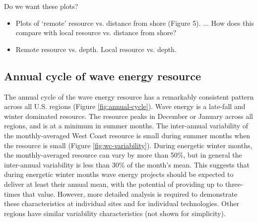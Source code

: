 
Do we want these plots?
\begin{itemize}
\item Plots of ‘remote’ resource vs. distance from shore (Figure 5). ... How does this compare with local resource vs. distance from shore?
\item Remote resource vs. depth. Local resource vs. depth.
\end{itemize}

\subsection{Annual cycle of wave energy resource}

The annual cycle of the wave energy resource has a remarkably consistent pattern across all U.S. regions (Figure \ref{fig:annual-cycle}). Wave energy is a late-fall and winter dominated resource. The resource peaks in December or January across all regions, and is at a minimum in summer months. The inter-annual variability of the monthly-averaged West Coast resource is small during summer months when the resource is small (Figure \ref{fig:wc-variability}). During energetic winter months, the monthly-averaged resource can vary by more than 50\%, but in general the inter-annual variability is less than 30\% of the month's mean. This suggests that during energetic winter months wave energy projects should be expected to deliver at least their annual mean, with the potential of providing up to three-times that value.  However, more detailed analysis is required to demonstrate these characteristics at individual sites and for individual technologies. Other regions have similar variability characteristics (not shown for simplicity).

